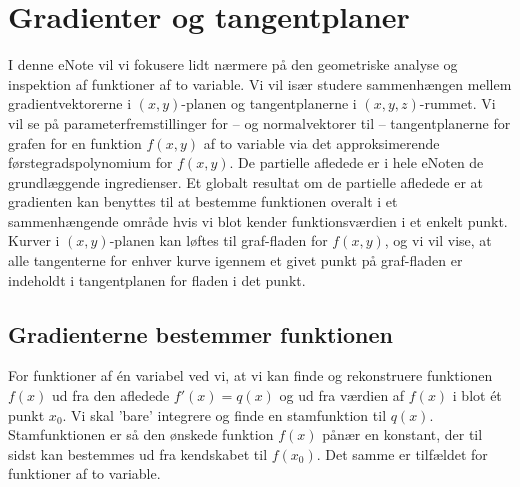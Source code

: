 
\setcounter{chapter}{15} %


\chapter{Gradienter og tangentplaner} \label{tn16}

\begin{basis}
I denne eNote vil vi fokusere lidt nærmere på den geometriske analyse og inspektion af funktioner af to variable. Vi vil især studere sammenhængen mellem gradientvektorerne i $(x,y)$-planen og tangentplanerne i $(x,y,z)$-rummet.  Vi vil se på parameterfremstillinger for -- og normalvektorer til -- tangentplanerne for grafen for en funktion $f(x,y)$ af to variable via det approksimerende førstegradspolynomium for $f(x,y)$. De partielle afledede er i hele eNoten de grundlæggende ingredienser. Et globalt resultat om de partielle afledede er at gradienten kan benyttes til at bestemme funktionen overalt i et sammenhængende område hvis vi blot kender funktionsværdien i et enkelt punkt.
Kurver i  $(x,y)$-planen kan løftes til graf-fladen  for $f(x,y)$, og vi vil vise, at alle tangenterne for enhver kurve igennem et givet punkt på graf-fladen er indeholdt i tangentplanen for fladen i det punkt.
\end{basis}






\section{Gradienterne bestemmer funktionen} \label{secDefVal}



For  funktioner af \'{e}n variabel ved vi, at vi kan finde og rekonstruere funktionen $f(x)$ ud fra den afledede $f'(x) = q(x)$ og ud fra værdien af $f(x)$ i blot \'{e}t punkt $x_{0}$. Vi skal 'bare' integrere og finde en stamfunktion til $q(x)$. Stamfunktionen er så den ønskede funktion $f(x)$ pånær en konstant, der til sidst kan bestemmes ud fra kendskabet til $f(x_{0})$. Det samme er tilfældet for funktioner af to variable.\\

